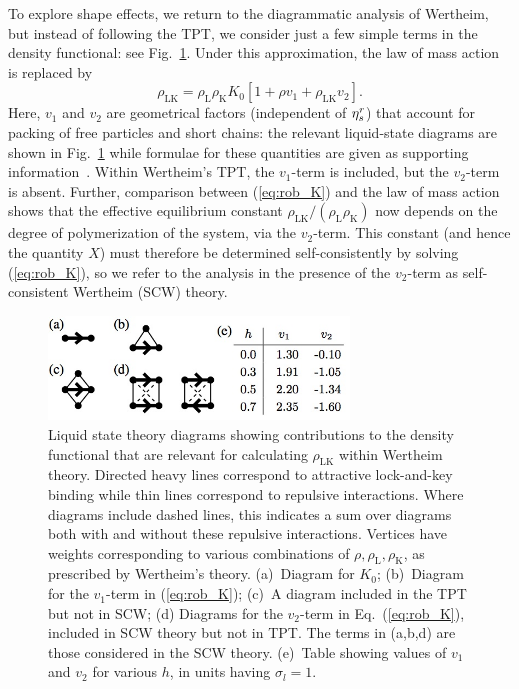 \documentclass[8.5pt,oneside,onecolumn]{article}
\newcommand{\rhoL}{\rho_\mathrm{L}}
\newcommand{\rhoK}{\rho_\mathrm{K}}
\newcommand{\rhoLK}{\rho_\mathrm{LK}}
\begin{document}
To explore shape effects, we return to the diagrammatic analysis of Wertheim, but
instead of following the TPT, we consider
just a few simple terms in the density functional: see
Fig.~\ref{fig:diagrams}.  
%
Under this approximation, the law of mass
action is replaced by
%
\begin{equation}
\rhoLK = \rhoL \rhoK K_0 [ 1 + \rho v_1 + \rhoLK v_2 ]  .
\label{eq:rob_K}
\end{equation}
Here, $v_1$ and $v_2$ are geometrical factors (independent of $\eta_s^r$) that account for packing
of free particles and short chains: the relevant liquid-state diagrams are shown in Fig.~\ref{fig:diagrams} while 
formulae for these quantities are given as supporting information~\cite{SI}.
Within Wertheim's TPT, the $v_1$-term is included, but the $v_2$-term is absent.  
Further, comparison between (\ref{eq:rob_K}) and the law of mass action shows that the effective equilibrium
constant $\rhoLK/(\rhoL\rhoK)$ now depends on the degree of polymerization of the system, via the $v_2$-term.  
This constant (and hence the quantity $X$) must therefore be determined
self-consistently by solving (\ref{eq:rob_K}), so we refer to the analysis in the presence of the $v_2$-term as self-consistent Wertheim (SCW) theory.

\begin{figure} 
\includegraphics[width=8cm]{Fig7.jpg}
  \caption{Liquid state theory diagrams showing contributions to the density functional that are
  relevant for calculating $\rhoLK$ within Wertheim theory. 
  Directed heavy lines correspond to attractive lock-and-key binding
  while thin lines correspond to repulsive interactions.  Where diagrams include
  dashed lines, this indicates a sum over diagrams both with and without these repulsive
  interactions.  Vertices have weights corresponding to various combinations of $\rho,\rhoL,\rhoK$,
  as prescribed by Wertheim's theory.
  (a)~Diagram for $K_0$; (b)~Diagram for the $v_1$-term in (\ref{eq:rob_K}); (c)~A diagram included
  in the TPT but not in SCW; (d) Diagrams for the $v_2$-term in Eq.~(\ref{eq:rob_K}), included in SCW theory but not in TPT.  
  The terms in (a,b,d) are those considered in the SCW theory.
  (e)~Table showing values
  of $v_1$ and $v_2$ for various $h$, in units having $\sigma_l=1$.}
  \label{fig:diagrams}
\end{figure}
\end{document}
